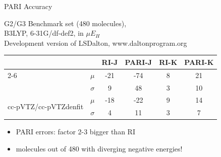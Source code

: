 

\begin{frame}{PARI Accuracy}
  \footnotesize

\begin{center}
  G2/G3   Benchmark set (480 molecules),
  \\ B3LYP, 6-31G/df-def2, in $\mu E_H$
\\      {\tiny{Development version of LSDalton, www.daltonprogram.org}}
\begin{tabular}{lccccc}
\hline
\hline
&  &  RI-J  &  PARI-J  &  RI-K  &  PARI-K   \\ 
\cline{2-6}
\multirow{3}{*}{6-31G/df-def2}          & $\mu$    & -21 & -74 & 8  & 21 \\  
                                        & $\sigma$ & 9   & 48  & 3  & 10 \\  
\hline
\multirow{3}{*}{ cc-pVTZ/cc-pVTZdenfit}  & $\mu$   & -18 & -22 & 9  & 14 \\  
                                        & $\sigma$ & 4   & 11  & 3  & 7 \\  
\hline
\hline
\end{tabular}
\end{center}

  \begin{itemize}
  \item PARI errors: {\blue factor 2-3 bigger than RI  }
  \item { molecules out of 480 with diverging negative energies!}
  \end{itemize}

\end{frame}


